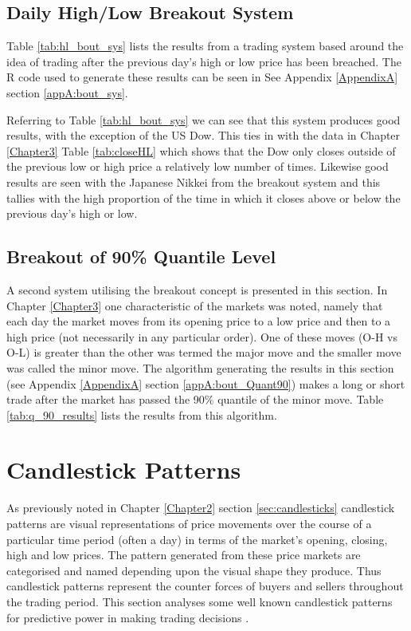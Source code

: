 \subsection{Daily High/Low Breakout System}
\label{sec:chp5:bout_sys}
Table \ref{tab:hl_bout_sys} lists the results from a trading system based around the idea of trading after the previous day's high or low price has been breached. The R code used to generate these results can be seen in See Appendix \ref{AppendixA} section \ref{appA:bout_sys}.



Referring to Table \ref{tab:hl_bout_sys} we can see that this system produces good results, with the exception of the US Dow. This ties in with the data in Chapter \ref{Chapter3} Table \ref{tab:closeHL} which shows that the Dow only closes outside of the previous low or high price a relatively low number of times. Likewise good results are seen with the Japanese Nikkei from the breakout system and this tallies with the high proportion of the time in which it closes above or below the previous day's high or low.

\subsection{Breakout of 90\% Quantile Level}
A second system utilising the breakout concept is presented in this section. In Chapter \ref{Chapter3} one characteristic of the markets was noted, namely that each day the market moves from its opening price to a low price and then to a high price (not necessarily in any particular order). One of these moves (O-H vs O-L) is greater than the other was termed the major move and the smaller move was called the minor move. The algorithm generating the results in this section (see Appendix \ref{AppendixA} section \ref{appA:bout_Quant90}) makes a long or short trade after the market has passed the 90\% quantile of the minor move. Table \ref{tab:q_90_results} lists the results from this algorithm.



\section{Candlestick Patterns}
As previously noted in Chapter \ref{Chapter2} section \ref{sec:candlesticks} candlestick patterns are visual representations of price movements over the course of a particular time period (often a day) in terms of the market's opening, closing, high and low prices. The pattern generated from these price markets are categorised and named depending upon the visual shape they produce. Thus candlestick patterns represent the counter forces of buyers and sellers throughout the trading period. This section analyses some well known candlestick patterns for predictive power in making trading decisions \citep{Lu201465}.

